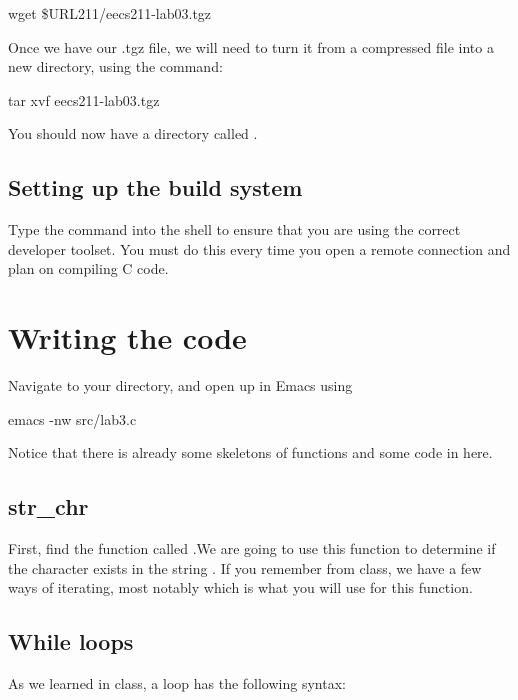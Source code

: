 \documentclass{tufte-handout}
\def\ThisLabBase{eecs211-lab03}
\begin{document}
\begin{CmdLine}
  \prompt wget \$URL211/\ThisLabBase.tgz
\end{CmdLine}

Once we have our .tgz file, we will need to turn it from a compressed
file into a new directory, using the  command:

\begin{CmdLine}
  \prompt tar xvf \ThisLabBase.tgz
\end{CmdLine}

You should now have a directory called \filename{\ThisLabBase}.

\subsection{Setting up the build system}
Type the  command into the shell to ensure that you are
using the correct developer toolset. You must do this every time you
open a remote connection and plan on compiling C code.

\section{Writing the code}
Navigate to your \filename{\LabBaseUrl} directory, and open up
 in Emacs using
\begin{CmdLine}
  \prompt emacs -nw src/lab3.c
\end{CmdLine}
Notice that there is already some skeletons of functions and some code in  here.

\subsection{str\_chr}
First, find the function called
.We are going to use this function to determine if the character  exists in the string . If you remember from class, we have a few ways of iterating, most notably  which is what you will use for this function.

\subsection{While loops}
As we learned in class, a  loop has the following
syntax:
\end{document}
